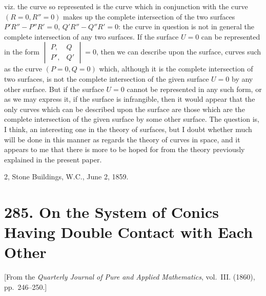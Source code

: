 \documentclass[11pt,a4paper]{book}
\begin{document}
viz. the curve so represented is the curve which in conjunction with the curve $(R = 0, R'' = 0)$ makes up the complete intersection of the two surfaces $P'R'' - P''R' = 0$, $Q'R'' - Q''R' = 0$: the curve in question is not in general the complete intersection of any two surfaces. If the surface $U = 0$ can be represented in the form $\begin{vmatrix} P, & Q \\ P', & Q' \end{vmatrix} = 0$, then we can describe upon the surface, curves such as the curve $(P = 0, Q = 0)$ which, although it is the complete intersection of two surfaces, is not the complete intersection of the given surface $U = 0$ by any other surface. But if the surface $U = 0$ cannot be represented in any such form, or as we may express it, if the surface is infrangible, then it would appear that the only curves which can be described upon the surface are those which are the complete intersection of the given surface by some other surface. The question is, I think, an interesting one in the theory of surfaces, but I doubt whether much will be done in this manner as regards the theory of curves in space, and it appears to me that there is more to be hoped for from the theory previously explained in the present paper.

\hfill 2, Stone Buildings, W.C., June 2, 1859.



\newpage
\section*{285. On the System of Conics Having Double Contact with Each Other}
\label{sec:285}

[From the \textit{Quarterly Journal of Pure and Applied Mathematics}, vol.~III. (1860), pp.~246--250.]
\end{document}
